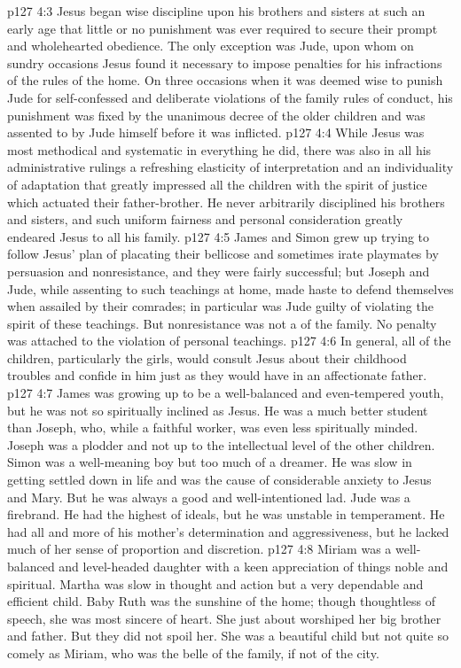 \vs p127 4:3 Jesus began wise discipline upon his brothers and sisters at such an early age that little or no punishment was ever required to secure their prompt and wholehearted obedience. The only exception was Jude, upon whom on sundry occasions Jesus found it necessary to impose penalties for his infractions of the rules of the home. On three occasions when it was deemed wise to punish Jude for self\hyp{}confessed and deliberate violations of the family rules of conduct, his punishment was fixed by the unanimous decree of the older children and was assented to by Jude himself before it was inflicted.
\vs p127 4:4 While Jesus was most methodical and systematic in everything he did, there was also in all his administrative rulings a refreshing elasticity of interpretation and an individuality of adaptation that greatly impressed all the children with the spirit of justice which actuated their father\hyp{}brother. He never arbitrarily disciplined his brothers and sisters, and such uniform fairness and personal consideration greatly endeared Jesus to all his family.
\vs p127 4:5 James and Simon grew up trying to follow Jesus’ plan of placating their bellicose and sometimes irate playmates by persuasion and nonresistance, and they were fairly successful; but Joseph and Jude, while assenting to such teachings at home, made haste to defend themselves when assailed by their comrades; in particular was Jude guilty of violating the spirit of these teachings. But nonresistance was not a  of the family. No penalty was attached to the violation of personal teachings.\plusone
\vs p127 4:6 In general, all of the children, particularly the girls, would consult Jesus about their childhood troubles and confide in him just as they would have in an affectionate father.
\vs p127 4:7 James was growing up to be a well\hyp{}balanced and even\hyp{}tempered youth, but he was not so spiritually inclined as Jesus. He was a much better student than Joseph, who, while a faithful worker, was even less spiritually minded. Joseph was a plodder and not up to the intellectual level of the other children. Simon was a well\hyp{}meaning boy but too much of a dreamer. He was slow in getting settled down in life and was the cause of considerable anxiety to Jesus and Mary. But he was always a good and well\hyp{}intentioned lad. Jude was a firebrand. He had the highest of ideals, but he was unstable in temperament. He had all and more of his mother’s determination and aggressiveness, but he lacked much of her sense of proportion and discretion.
\vs p127 4:8 Miriam was a well\hyp{}balanced and level\hyp{}headed daughter with a keen appreciation of things noble and spiritual. Martha was slow in thought and action but a very dependable and efficient child. Baby Ruth was the sunshine of the home; though thoughtless of speech, she was most sincere of heart. She just about worshiped her big brother and father. But they did not spoil her. She was a beautiful child but not quite so comely as Miriam, who was the belle of the family, if not of the city.
